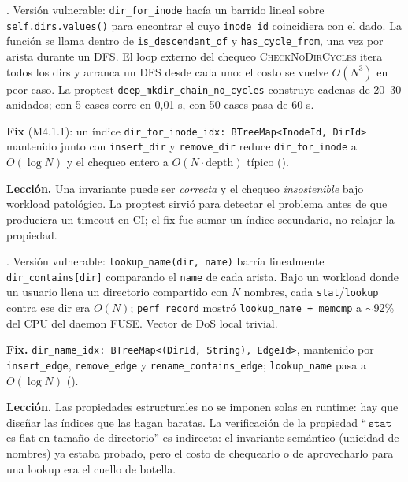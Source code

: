 \begin{trampa}
\label{tr:cycle-cost}
. Versión vulnerable: \texttt{dir\_for\_inode}
hacía un barrido lineal sobre \texttt{self.dirs.values()} para encontrar
el \NDir{} cuyo \texttt{inode\_id} coincidiera con el dado. La función se
llama dentro de \texttt{is\_descendant\_of} y \texttt{has\_cycle\_from},
una vez por arista durante un DFS. El loop externo del chequeo
\textsc{CheckNoDirCycles} itera todos los dirs y arranca un DFS desde
cada uno: el costo se vuelve $O(N^3)$ en peor caso. La proptest
\texttt{deep\_mkdir\_chain\_no\_cycles} construye cadenas de 20--30
\opmkdir{} anidados; con 5 cases corre en 0{,}01 s, con 50 cases pasa de
60 s.

\textbf{Fix} (M4.1.1): un índice \texttt{dir\_for\_inode\_idx:
BTreeMap<InodeId, DirId>} mantenido junto con \texttt{insert\_dir} y
\texttt{remove\_dir} reduce \texttt{dir\_for\_inode} a $O(\log N)$ y el
chequeo entero a $O(N \cdot \mathrm{depth})$ típico
().

\textbf{Lección.} Una invariante puede ser \emph{correcta} y el chequeo
\emph{insostenible} bajo workload patológico. La proptest sirvió para
detectar el problema antes de que produciera un timeout en CI; el fix
fue sumar un índice secundario, no relajar la propiedad.
\end{trampa}

\begin{trampa}
\label{tr:on-cube}
. Versión vulnerable:
\texttt{lookup\_name(dir, name)} barría linealmente
\texttt{dir\_contains[dir]} comparando el \texttt{name} de cada arista.
Bajo un workload donde un usuario llena un directorio compartido con $N$
nombres, cada \texttt{stat}/\texttt{lookup} contra ese dir era $O(N)$;
\texttt{perf record} mostró \texttt{lookup\_name + memcmp} a $\sim$92\%
del CPU del daemon FUSE. Vector de DoS local trivial.

\textbf{Fix.} \texttt{dir\_name\_idx: BTreeMap<(DirId, String), EdgeId>},
mantenido por \texttt{insert\_edge}, \texttt{remove\_edge} y
\texttt{rename\_contains\_edge}; \texttt{lookup\_name} pasa a $O(\log N)$
().

\textbf{Lección.} Las propiedades estructurales no se imponen solas en
runtime: hay que diseñar las índices que las hagan baratas. La
verificación de la propiedad ``\,$\texttt{stat}$ es flat en tamaño de
directorio'' es indirecta: el invariante semántico (unicidad de
nombres) ya estaba probado, pero el costo de chequearlo o de aprovecharlo
para una lookup era el cuello de botella.
\end{trampa}

